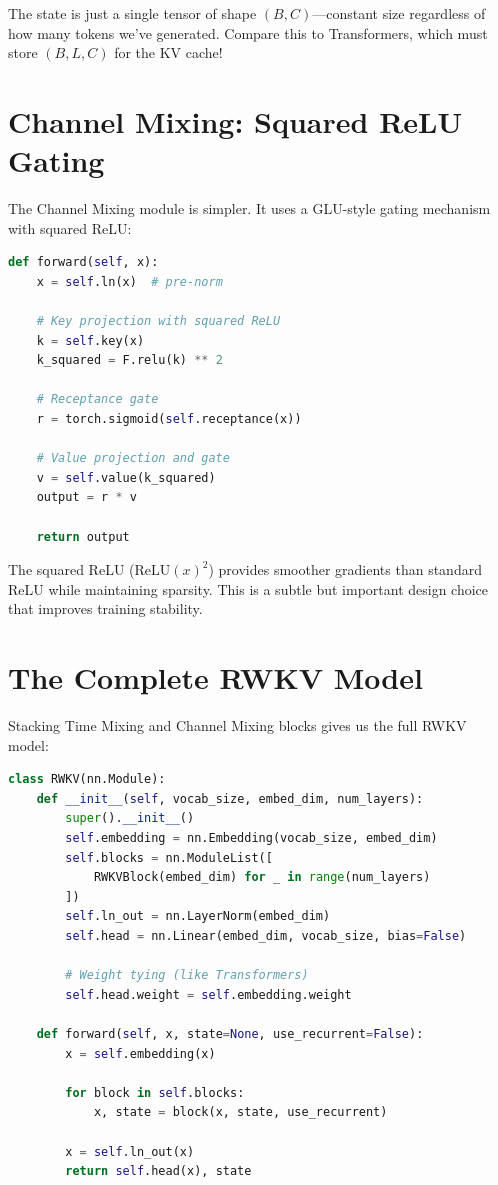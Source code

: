 \documentclass[12pt]{article}
\begin{document}
The state is just a single tensor of shape $(B, C)$—constant size regardless of how many tokens we've generated. Compare this to Transformers, which must store $(B, L, C)$ for the KV cache!

\section*{Channel Mixing: Squared ReLU Gating}

The Channel Mixing module is simpler. It uses a GLU-style gating mechanism with squared ReLU:

\begin{lstlisting}[language=Python, basicstyle=\small\ttfamily]
def forward(self, x):
    x = self.ln(x)  # pre-norm
    
    # Key projection with squared ReLU
    k = self.key(x)
    k_squared = F.relu(k) ** 2
    
    # Receptance gate
    r = torch.sigmoid(self.receptance(x))
    
    # Value projection and gate
    v = self.value(k_squared)
    output = r * v
    
    return output
\end{lstlisting}

The squared ReLU ($\text{ReLU}(x)^2$) provides smoother gradients than standard ReLU while maintaining sparsity. This is a subtle but important design choice that improves training stability.

\section*{The Complete RWKV Model}

Stacking Time Mixing and Channel Mixing blocks gives us the full RWKV model:

\begin{lstlisting}[language=Python, basicstyle=\small\ttfamily]
class RWKV(nn.Module):
    def __init__(self, vocab_size, embed_dim, num_layers):
        super().__init__()
        self.embedding = nn.Embedding(vocab_size, embed_dim)
        self.blocks = nn.ModuleList([
            RWKVBlock(embed_dim) for _ in range(num_layers)
        ])
        self.ln_out = nn.LayerNorm(embed_dim)
        self.head = nn.Linear(embed_dim, vocab_size, bias=False)
        
        # Weight tying (like Transformers)
        self.head.weight = self.embedding.weight
    
    def forward(self, x, state=None, use_recurrent=False):
        x = self.embedding(x)
        
        for block in self.blocks:
            x, state = block(x, state, use_recurrent)
        
        x = self.ln_out(x)
        return self.head(x), state
\end{lstlisting}
\end{document}
